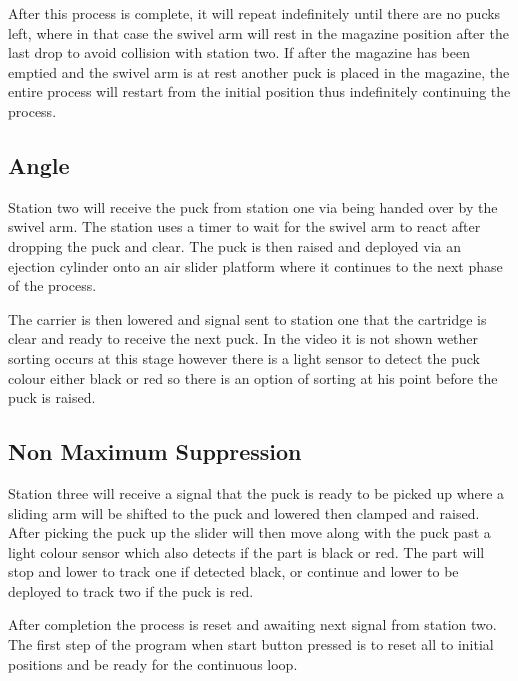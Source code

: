 \documentclass[a4paper, 10pt]{article}
\begin{document}
After this process is complete, it will repeat indefinitely until there are no pucks left, where in that case the swivel arm will rest in the magazine position after the last drop to avoid collision with station two. If after the magazine has been emptied and the swivel arm is at rest another puck is placed in the magazine, the entire process will restart from the initial position thus indefinitely continuing the process.


\subsection{Angle}
Station two will receive the puck from station one via being handed over by the swivel arm. The station uses a timer to wait for the swivel arm to react after dropping the puck and clear. The puck is then raised and deployed via an ejection cylinder onto an air slider platform where it continues to the next phase of the process.

The carrier is then lowered and signal sent to station one that the cartridge is clear and ready to receive the next puck. In the video it is not shown wether sorting occurs at this stage however there is a light sensor to detect the puck colour either black or red so there is an option of sorting at his point before the puck is raised.



\subsection{Non Maximum Suppression}
Station three will receive a signal that the puck is ready to be picked up where a sliding arm will be shifted to the puck and lowered then clamped and raised. After picking the puck up the slider will then move along with the puck past a light colour sensor which also detects if the part is black or red. The part will stop and lower to track one if detected black, or continue and lower to be deployed to track two if the puck is red.

After completion the process is reset and awaiting next signal from station two. The first step of the program when start button pressed is to reset all to initial positions and be ready for the continuous loop.


\end{document}

